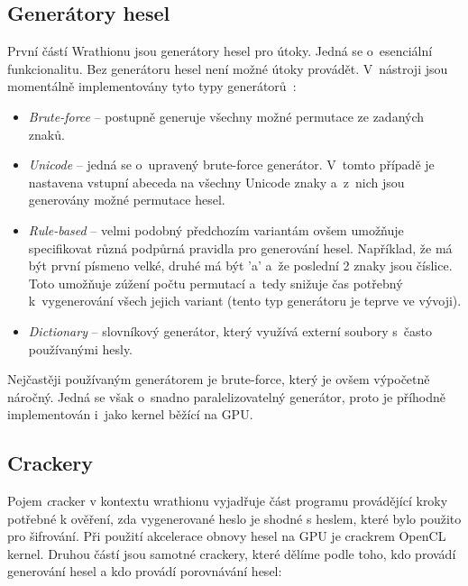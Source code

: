 \subsection{Generátory hesel}
První částí Wrathionu jsou generátory hesel pro útoky. Jedná se o~esenciální
funkcionalitu. Bez generátoru hesel není možné útoky provádět. V~nástroji jsou momentálně
implementovány tyto typy generátorů~\cite{Hranicky}:
\begin{itemize}
    \item {\it Brute-force} -- postupně generuje všechny možné permutace ze zadaných znaků.
    \item {\it Unicode} -- jedná se o~upravený brute-force generátor. V~tomto případě je nastavena
	vstupní abeceda na všechny Unicode znaky a~z~nich jsou generovány možné permutace hesel.
    \item {\it Rule-based} -- velmi podobný předchozím variantám ovšem umožňuje specifikovat různá
	podpůrná pravidla pro generování hesel. Například, že má být první písmeno velké, druhé má
	být 'a' a~že poslední 2 znaky jsou číslice. Toto umožňuje zúžení počtu permutací a~tedy
	snižuje čas potřebný k~vygenerování všech jejich variant (tento typ generátoru je teprve
	ve vývoji).
    \item {\it Dictionary} -- slovníkový generátor, který využívá externí soubory s~často
	používanými hesly.
\end{itemize}
Nejčastěji používaným generátorem je brute-force, který je ovšem výpočetně náročný. Jedná se
však o~snadno paralelizovatelný generátor, proto je příhodně implementován i~jako kernel běžící na
GPU.
\subsection{Crackery}
Pojem {\textit cracker} v kontextu wrathionu vyjadřuje část programu provádějící kroky potřebné k
ověření, zda vygenerované heslo je shodné s heslem, které bylo použito pro šifrování. Při použití
akcelerace obnovy hesel na GPU je crackrem OpenCL kernel.
Druhou částí jsou samotné crackery, které dělíme podle toho, kdo provádí generování hesel a
kdo provádí porovnávání hesel:

